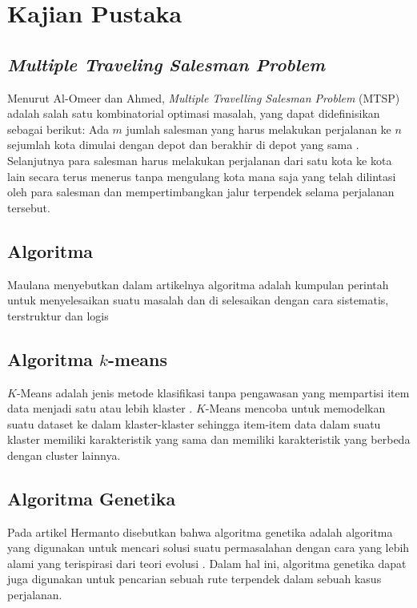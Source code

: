 
\section{Kajian Pustaka}

\subsection{\textit{Multiple Traveling Salesman Problem}}

Menurut Al-Omeer dan Ahmed, \textit{Multiple Travelling Salesman Problem} (MTSP) adalah salah satu kombinatorial optimasi masalah, yang dapat didefinisikan sebagai berikut: Ada $m$ jumlah salesman yang harus melakukan perjalanan ke $n$ sejumlah kota dimulai dengan depot dan berakhir di depot yang sama \cite{al2019comparative}. Selanjutnya para salesman harus melakukan perjalanan dari satu kota ke kota lain secara terus menerus tanpa mengulang kota mana saja yang telah dilintasi oleh para salesman dan mempertimbangkan jalur terpendek selama perjalanan tersebut.

\subsection{Algoritma}

Maulana menyebutkan dalam artikelnya algoritma adalah kumpulan perintah untuk menyelesaikan suatu masalah dan di selesaikan dengan cara sistematis, terstruktur dan logis \cite{maulana2017pembelajaran}

\subsection{Algoritma $k$-means}

$K$-Means adalah jenis metode klasifikasi tanpa pengawasan yang mempartisi item data menjadi satu atau lebih klaster \cite{agusta2007k}. $K$-Means mencoba untuk memodelkan suatu dataset ke dalam klaster-klaster sehingga item-item data dalam suatu klaster memiliki karakteristik yang sama dan memiliki karakteristik yang berbeda dengan cluster lainnya.

\subsection{Algoritma Genetika}

Pada artikel Hermanto disebutkan bahwa algoritma genetika adalah algoritma yang digunakan untuk mencari solusi suatu permasalahan dengan cara yang lebih alami yang terispirasi dari teori evolusi  \cite{hermawanto2003algoritma}. Dalam hal ini, algoritma genetika dapat juga digunakan untuk pencarian sebuah rute terpendek dalam sebuah kasus perjalanan.
